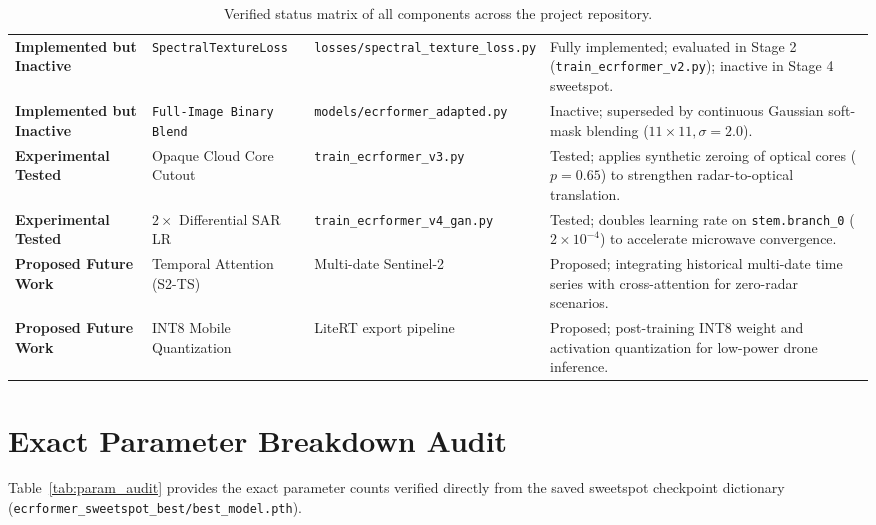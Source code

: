 \begin{table}[htbp]
\begin{tabularx}{\textwidth}{llp{3.5cm}X}
\midrule
\textbf{Implemented but Inactive} & \texttt{SpectralTextureLoss} & \texttt{losses/spectral\_texture\_loss.py} & Fully implemented; evaluated in Stage 2 (\texttt{train\_ecrformer\_v2.py}); inactive in Stage 4 sweetspot. \\
\textbf{Implemented but Inactive} & \texttt{Full-Image Binary Blend} & \texttt{models/ecrformer\_adapted.py} & Inactive; superseded by continuous Gaussian soft-mask blending ($11\times 11, \sigma=2.0$). \\
\midrule
\textbf{Experimental Tested} & Opaque Cloud Core Cutout & \texttt{train\_ecrformer\_v3.py} & Tested; applies synthetic zeroing of optical cores ($p=0.65$) to strengthen radar-to-optical translation. \\
\textbf{Experimental Tested} & $2\times$ Differential SAR LR & \texttt{train\_ecrformer\_v4\_gan.py} & Tested; doubles learning rate on \texttt{stem.branch\_0} ($2\times 10^{-4}$) to accelerate microwave convergence. \\
\midrule
\textbf{Proposed Future Work} & Temporal Attention (S2-TS) & Multi-date Sentinel-2 & Proposed; integrating historical multi-date time series with cross-attention for zero-radar scenarios. \\
\textbf{Proposed Future Work} & INT8 Mobile Quantization & LiteRT export pipeline & Proposed; post-training INT8 weight and activation quantization for low-power drone inference. \\
\bottomrule
\end{tabularx}
\caption{Verified status matrix of all components across the project repository.}
\label{tab:status_matrix}
\end{table}

\section{Exact Parameter Breakdown Audit}
Table~\ref{tab:param_audit} provides the exact parameter counts verified directly from the saved sweetspot checkpoint dictionary (\texttt{ecrformer\_sweetspot\_best/best\_model.pth}).

